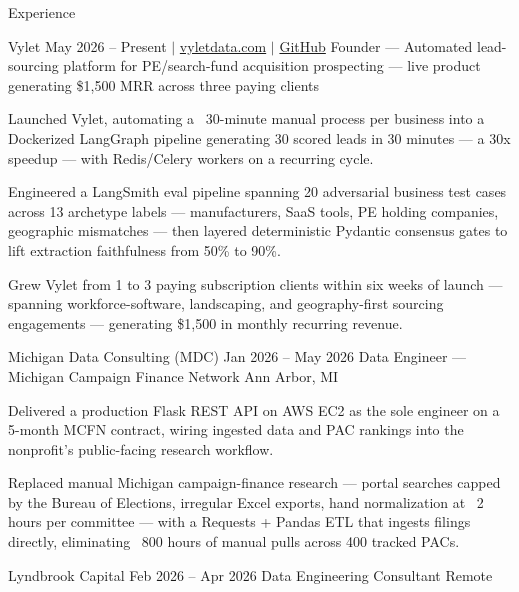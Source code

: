 \documentclass[
	11pt
]{../../../template}
\begin{document}
	\begin{rSection}{E}{xperience}
		\begin{rSectionEntry}
			{Vylet}
			{May 2026 -- Present $\vert$ \href{https://vyletdata.com}{vyletdata.com} $\vert$ \href{https://github.com/Verdent06/Lead-Gen-Agentic-Pipeline}{GitHub}}
			{Founder --- Automated lead-sourcing platform for PE/search-fund acquisition prospecting --- live product generating \$1,500 MRR across three paying clients}
			{}
			{}

			\item Launched Vylet, automating a ~30-minute manual process per business into a Dockerized LangGraph pipeline generating 30 scored leads in 30 minutes --- a 30x speedup --- with Redis/Celery workers on a recurring cycle.
			\item Engineered a LangSmith eval pipeline spanning 20 adversarial business test cases across 13 archetype labels --- manufacturers, SaaS tools, PE holding companies, geographic mismatches --- then layered deterministic Pydantic consensus gates to lift extraction faithfulness from 50\% to 90\%.
			\item Grew Vylet from 1 to 3 paying subscription clients within six weeks of launch --- spanning workforce-software, landscaping, and geography-first sourcing engagements --- generating \$1,500 in monthly recurring revenue.
		\end{rSectionEntry}

		\begin{rSectionEntry}
			{Michigan Data Consulting (MDC)}
			{Jan 2026 -- May 2026}
			{Data Engineer --- Michigan Campaign Finance Network}
			{}
			{Ann Arbor, MI}

			\item Delivered a production Flask REST API on AWS EC2 as the sole engineer on a 5-month MCFN contract, wiring ingested data and PAC rankings into the nonprofit's public-facing research workflow.
			\item Replaced manual Michigan campaign-finance research — portal searches capped by the Bureau of Elections, irregular Excel exports, hand normalization at ~2 hours per committee — with a Requests + Pandas ETL that ingests filings directly, eliminating ~800 hours of manual pulls across 400 tracked PACs.
		\end{rSectionEntry}

		\begin{rSectionEntry}
			{Lyndbrook Capital}
			{Feb 2026 -- Apr 2026}
			{Data Engineering Consultant}
			{}
			{Remote}


\end{rSectionEntry}
\end{rSection}
\end{document}
